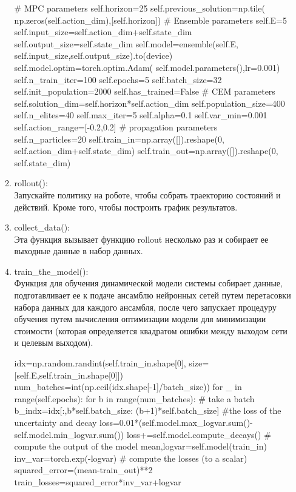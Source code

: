\documentclass[a4paper,12pt]{article}
\begin{document}
\begin{enumerate}
\begin{enumerate}
\begin{python}
# MPC parameters
self.horizon=25
self.previous_solution=np.tile(
        np.zeros(self.action_dim),[self.horizon])
# Ensemble parameters
self.E=5
self.input_size=self.action_dim+self.state_dim
self.output_size=self.state_dim
self.model=ensemble(self.E,
    self.input_size,self.output_size).to(device)
self.model.optim=torch.optim.Adam(
    self.model.parameters(),lr=0.001)
self.n_train_iter=100
self.epochs=5
self.batch_size=32
self.init_population=2000
self.has_trained=False
# CEM parameters
self.solution_dim=self.horizon*self.action_dim
self.population_size=400
self.n_elites=40
self.max_iter=5
self.alpha=0.1
self.var_min=0.001
self.action_range=[-0.2,0.2]
# propagation parameters
self.n_particles=20
self.train_in=np.array([]).reshape(0,
            self.action_dim+self.state_dim)
self.train_out=np.array([]).reshape(0,
            self.state_dim)
\end{python}
\newpage
\item rollout():\\
Запускайте политику на роботе, чтобы собрать траекторию состояний и действий. Кроме того, чтобы построить график результатов.
\item collect\_data():\\
Эта функция вызывает функцию rollout несколько раз и собирает ее выходные данные в набор данных.
\item train\_the\_model():\\
Функция для обучения динамической модели системы собирает данные, подготавливает ее к подаче ансамблю нейронных сетей путем перетасовки набора данных для каждого ансамбля, после чего запускает процедуру обучения путем вычисления оптимизации модели для минимизации стоимости (которая определяется квадратом ошибки между выходом сети и целевым выходом).
\begin{python}
idx=np.random.randint(self.train_in.shape[0],
    size=[self.E,self.train_in.shape[0]])
num_batches=int(np.ceil(idx.shape[-1]/batch_size))
for _ in range(self.epochs):
    for b in range(num_batches):
        # take a batch
        b_indx=idx[:,b*self.batch_size:
                        (b+1)*self.batch_size]
        #the loss of the uncertainty and decay
        loss=0.01*(self.model.max_logvar.sum()-
                    self.model.min_logvar.sum())
        loss+=self.model.compute_decays()
        # compute the output of the model
        mean,logvar=self.model(train_in)
        inv_var=torch.exp(-logvar)
        # compute the losses (to a scalar)
        squared_error=(mean-train_out)**2
        train_losses=squared_error*inv_var+logvar

\end{python}
\end{enumerate}
\end{enumerate}
\end{document}

